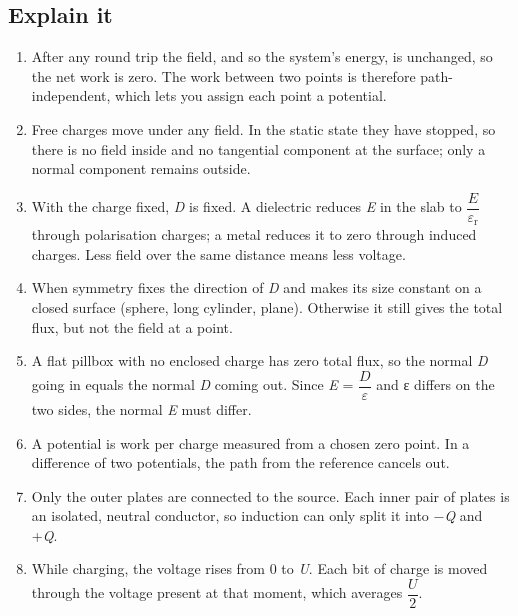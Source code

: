 \documentclass[11pt]{article}
\begin{document}
\begin{keepsection}\subsection{Explain it}

\begin{enumerate}
\item After any round trip the field, and so the system’s energy, is unchanged, so the net work is zero. The work between two points is therefore path-independent, which lets you assign each point a potential.
\item Free charges move under any field. In the static state they have stopped, so there is no field inside and no tangential component at the surface; only a normal component remains outside.
\item With the charge fixed, \textit{D} is fixed. A dielectric reduces \textit{E} in the slab to {\small\ensuremath{\dfrac{{E}}{ε_{\mathrm{r}}}}} through polarisation charges; a metal reduces it to zero through induced charges. Less field over the same distance means less voltage.
\item When symmetry fixes the direction of \textit{D} and makes its size constant on a closed surface (sphere, long cylinder, plane). Otherwise it still gives the total flux, but not the field at a point.
\item A flat pillbox with no enclosed charge has zero total flux, so the normal \textit{D} going in equals the normal \textit{D} coming out. Since \textit{E} = {\small\ensuremath{\dfrac{{D}}{ε}}} and ε differs on the two sides, the normal \textit{E} must differ.
\item A potential is work per charge measured from a chosen zero point. In a difference of two potentials, the path from the reference cancels out.
\item Only the outer plates are connected to the source. Each inner pair of plates is an isolated, neutral conductor, so induction can only split it into \ensuremath{-}\textit{Q} and +\textit{Q}.
\item While charging, the voltage rises from 0 to \textit{U}. Each bit of charge is moved through the voltage present at that moment, which averages {\small\ensuremath{\dfrac{{U}}{2}}}.
\end{enumerate}

\end{keepsection}
\end{document}
